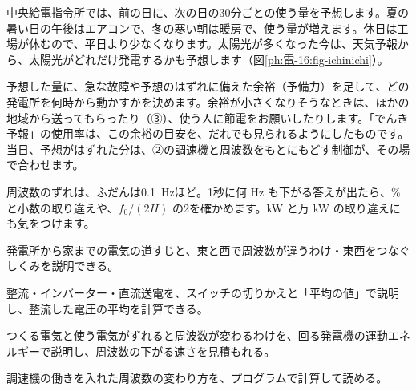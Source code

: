 \begin{phkougaku}[次の日の電気の量を予想する]
中央給電指令所では、前の日に、次の日の30分ごとの使う量を予想します。夏の暑い日の午後はエアコンで、冬の寒い朝は暖房で、使う量が増えます。休日は工場が休むので、平日より少なくなります。太陽光が多くなった今は、天気予報から、太陽光がどれだけ発電するかも予想します（図\ref{ph:電-16:fig-ichinichi}）。

予想した量に、急な故障や予想のはずれに備えた余裕（予備力）を足して、どの発電所を何時から動かすかを決めます。余裕が小さくなりそうなときは、ほかの地域から送ってもらったり（③）、使う人に節電をお願いしたりします。「でんき予報」の使用率は、この余裕の目安を、だれでも見られるようにしたものです。当日、予想がはずれた分は、②の調速機と周波数をもとにもどす制御が、その場で合わせます。
\begin{phketa}[電気を届ける数]
周波数のずれは、ふだんは\qty{0.1}{Hz}ほど。1秒に何 Hz も下がる答えが出たら、\% と小数の取り違えや、$f_0/(2H)$ の2を確かめます。kW と万 kW の取り違えにも気をつけます。
\end{phketa}
\end{phkougaku}

\begin{furikaeri}
\begin{checklist}
\item 発電所から家までの電気の道すじと、東と西で周波数が違うわけ・東西をつなぐしくみを説明できる。
\item 整流・インバーター・直流送電を、スイッチの切りかえと「平均の値」で説明し、整流した電圧の平均を計算できる。
\item つくる電気と使う電気がずれると周波数が変わるわけを、回る発電機の運動エネルギーで説明し、周波数の下がる速さを見積もれる。
\item 調速機の働きを入れた周波数の変わり方を、プログラムで計算して読める。
\end{checklist}
\end{furikaeri}
